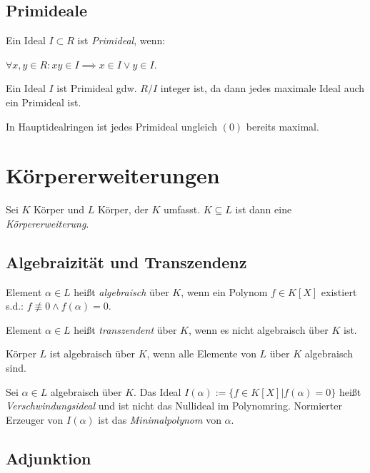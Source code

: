 \subsection*{Primideale}

Ein Ideal $I \subset R$ ist \emph{Primideal}, wenn:

$\forall x, y \in R : xy \in I \implies x \in I \lor y \in I$.

\vspace*{1mm}

Ein Ideal $I$ ist Primideal gdw. $R/I$ integer ist, da dann jedes maximale Ideal auch ein Primideal ist.

\vspace*{1mm}

In Hauptidealringen ist jedes Primideal ungleich $(0)$ bereits maximal.

\section*{Körpererweiterungen}

Sei $K$ Körper und $L$ Körper, der $K$ umfasst. $K \subseteq L$ ist dann eine \emph{Körpererweiterung}.

\subsection*{Algebraizität und Transzendenz}

Element $\alpha \in L$ heißt \emph{algebraisch} über $K$, wenn ein Polynom $f \in K[X]$ existiert s.d.: $f \not\equiv 0 \land f(\alpha) = 0$.

\vspace*{1mm}

Element $\alpha \in L$ heißt \emph{transzendent} über $K$, wenn es nicht algebraisch über $K$ ist.

\vspace*{1mm}

Körper $L$ ist algebraisch über $K$, wenn alle Elemente von $L$ über $K$ algebraisch sind.

\vspace*{1mm}

Sei $\alpha \in L$ algebraisch über $K$. Das Ideal $I(\alpha) := \{f \in K[X] | f(\alpha) = 0\}$ heißt \emph{Verschwindungsideal} und ist nicht das Nullideal im Polynomring. Normierter Erzeuger von $I(\alpha)$ ist das \emph{Minimalpolynom} von $\alpha$.

\subsection*{Adjunktion}

